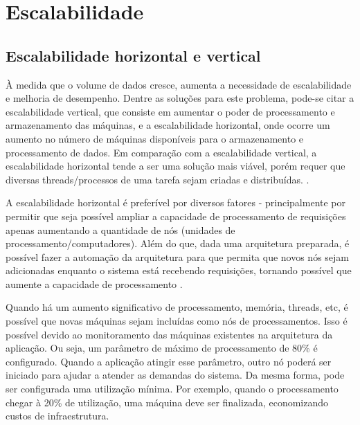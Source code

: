 \chapter{Escalabilidade}


\section{Escalabilidade horizontal e vertical}

\begin{citacao}

À medida que o volume de dados cresce, aumenta a
necessidade de escalabilidade e melhoria de desempenho. Dentre as soluções para este
problema, pode-se citar a escalabilidade vertical, que consiste em aumentar o poder de
processamento e armazenamento das máquinas, e a escalabilidade horizontal, onde ocorre um
aumento no número de máquinas disponíveis para o armazenamento e processamento de
dados. Em comparação com a escalabilidade vertical, a escalabilidade horizontal tende a ser
uma solução mais viável, porém requer que diversas threads/processos de uma tarefa sejam
criadas e distribuídas. \cite[3]{alexandre-morais-souza-2013}.

\end{citacao}

A escalabilidade horizontal é preferível por diversos fatores - principalmente por
permitir que seja possível ampliar a capacidade de processamento de requisições
apenas aumentando a quantidade de nós (unidades de processamento/computadores).
Além do que, dada uma arquitetura preparada, é possível fazer a automação da
arquitetura para que permita que novos nós sejam adicionadas enquanto o
sistema está recebendo requisições, tornando possível que aumente a capacidade
de processamento \cite{ivens-oliveira-porto-2009}.

Quando há um aumento significativo de processamento, memória, threads, etc,
é possível que novas máquinas sejam incluídas como nós de processamentos.
Isso é possível devido ao monitoramento das máquinas existentes na arquitetura
da aplicação. Ou seja, um parâmetro de máximo de processamento de 80\% é configurado.
Quando a aplicação atingir esse parâmetro, outro nó poderá ser iniciado para ajudar
a atender as demandas do sistema. Da mesma forma, pode ser configurada uma utilização
mínima. Por exemplo, quando o processamento chegar à 20\% de utilização, uma máquina
deve ser finalizada, economizando custos de infraestrutura.




